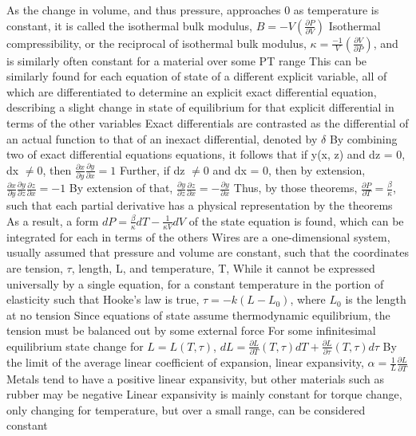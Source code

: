 \documentclass[11 pt, twoside]{article}
\newenvironment{outline*}
{
	\begin{outline}[enumerate]
	}
	{\end{outline}
}
\begin{document}
\begin{outline*}
\4 As the change in volume, and thus pressure, approaches 0 as temperature is constant, it is called the isothermal bulk modulus, $B = -V(\frac{\partial P}{\partial V})$
\4 Isothermal compressibility, or the reciprocal of isothermal bulk modulus, $\kappa = \frac{-1}{V}(\frac{\partial V}{\partial P})$, and is similarly often constant for a material over some PT range
\2 This can be similarly found for each equation of state of a different explicit variable, all of which are differentiated to determine an explicit exact differential equation, describing a slight change in state of equilibrium for that explicit differential in terms of the other variables
\3 Exact differentials are contrasted as the differential of an actual function to that of an inexact differential, denoted by $\delta$
\3 By combining two of exact differential equations equations, it follows that if y(x, z) and dz = 0, dx $\neq 0$, then $\frac{\partial x}{\partial y}\frac{\partial y}{\partial x} = 1$
\4 Further, if dz $\neq 0$ and dx = 0, then by extension, $\frac{\partial x}{\partial y}\frac{\partial y}{\partial z}\frac{\partial z}{\partial x} = -1$
\4 By extension of that, $\frac{\partial y}{\partial z}\frac{\partial z}{\partial x} = -\frac{\partial y}{\partial x}$
\3 Thus, by those theorems, $\frac{\partial P}{\partial T} = \frac{\beta}{\kappa}$, such that each partial derivative has a physical representation by the theorems
\4 As a result, a form $dP = \frac{\beta}{\kappa}dT - \frac{1}{\kappa V}dV$ of the state equation is found, which can be integrated for each in terms of the others
\1 Wires are a one-dimensional system, usually assumed that pressure and volume are constant, such that the coordinates are tension, $\tau$, length, L, and temperature, T,
\2 While it cannot be expressed universally by a single equation, for a constant temperature in the portion of elasticity such that Hooke's law is true, $\tau = -k(L - L_0)$, where $L_0$ is the length at no tension
\3 Since equations of state assume thermodynamic equilibrium, the tension must be balanced out by some external force
\2 For some infinitesimal equilibrium state change for $L = L(T, \tau)$, $dL = \frac{\partial L}{\partial T}(T, \tau)dT + \frac{\partial L}{\partial \tau}(T, \tau)d\tau$
\3 By the limit of the average linear coefficient of expansion, linear expansivity, $\alpha = \frac{1}{L}\frac{\partial L}{\partial T}$
\4 Metals tend to have a positive linear expansivity, but other materials such as rubber may be negative
\4 Linear expansivity is mainly constant for torque change, only changing for temperature, but over a small range, can be considered constant

\end{outline*}
\end{document}
